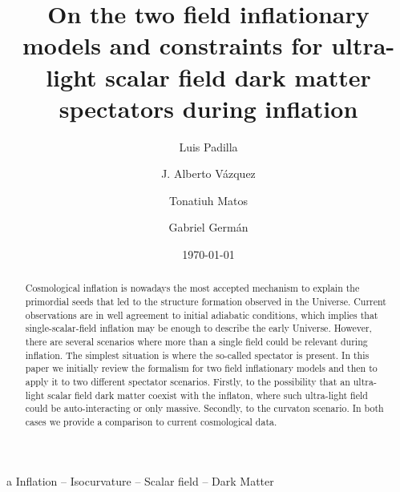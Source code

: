 \documentclass[amssymb,twocolumn,prd,nofootinbib,showpacs]{revtex4-1}
\begin{document}
\title{On the two field inflationary models and constraints for ultra-light scalar field dark matter spectators during inflation}
\author{Luis Padilla}  
   \author{J. Alberto V\'azquez}  
\author{Tonatiuh Matos}  
   \author{Gabriel Germ\'an}  

\date{\today}

\begin{abstract}
Cosmological inflation is nowadays the most accepted mechanism to explain the  primordial seeds 
that led to  the structure formation observed in the Universe. Current observations are in well agreement 
to initial adiabatic conditions, which implies that  single-scalar-field inflation may be enough to describe 
the early Universe. 
%
However, there are several scenarios where more than a single field could be relevant during inflation. 
The simplest situation is where the so-called spectator is present. 
In this paper we initially review the formalism for two field inflationary models and then to apply it to two different 
spectator scenarios. Firstly, to the possibility that an ultra-light scalar field dark matter coexist with the inflaton, 
where such ultra-light field could be auto-interacting or only massive. Secondly, to the curvaton scenario.
In both cases we provide a comparison to current cosmological data.    

\end{abstract}
\begin{keywords}
a Inflation  --  Isocurvature  --  Scalar field -- Dark Matter
\end{keywords}

\maketitle
\end{document}
